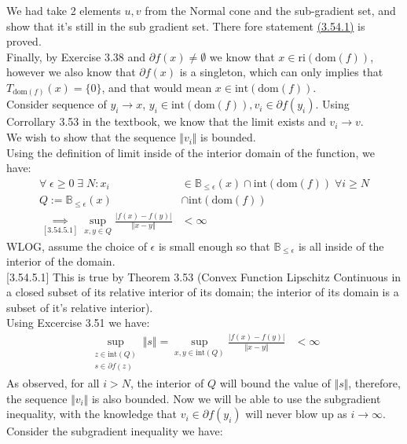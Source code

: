 \documentclass[]{article}
\begin{document}
    We had take 2 elements $u, v$ from the Normal cone and the sub-gradient set, and show that it's still in the sub gradient set. There fore statement \hyperref[eqn:3.54.1]{(3.54.1)} is proved. 
    \\[1.1em]
    Finally, by Exercise 3.38 and $\partial f(x)\neq \emptyset$ we know that $x\in \text{ri}(\text{dom}(f))$, however we also know that $\partial f(x)$ is a singleton, which can only implies that $T_{\text{dom}(f)}(x) = \{0\}$, and that would mean $x \in \text{int}(\text{dom}(f))$. 
    \\[1.1em]
    Consider sequence of $y_i \rightarrow x$, $y_i \in \text{int}(\text{dom}(f)),v_i \in \partial f(y_i)$. Using Corrollary 3.53 in the textbook, we know that the limit exists and $v_i \rightarrow v$. 
    \\[1.1em]
    We wish to show that the sequence $\Vert v_i\Vert$ is bounded. 
    \\
    Using the definition of limit inside of the interior domain of the function, we have: 
    \begin{align*}\tag{3.54.5}\label{eqn:3.54.5}
        \forall \;\epsilon \ge 0 \; \exists \;N: x_i &\in \mathbb{B}_{\le \epsilon}(x) \cap \text{int}(\text{dom}(f)) \;\forall i \ge N 
        \\
        Q := \mathbb{B}_{\le \epsilon}(x) &\cap \text{int}(\text{dom}(f)) 
        \\
        \underset{[3.54.5.1]}{\implies} \sup_{x,y\in Q} 
        \frac{|f(x) - f(y)|}{\Vert x - y\Vert} &< \infty 
    \end{align*}
    WLOG, assume the choice of $\epsilon$ is small enough so that $\mathbb{B}_{\le \epsilon}$ is all inside of the interior of the domain. 
    \\[0em]
    [3.54.5.1] This is true by Theorem 3.53 (Convex Function Lipschitz Continuous in a closed subset of its relative interior of its domain;  the interior of its domain is a subset of it's relative interior). 
    \\ [1.1em]
    Using Excercise 3.51 we have: 
    \begin{align*}\tag{3.54.6}\label{eqn:3.54.6}
        \sup_{\substack{z\in \text{int}(Q)\\ s \in \partial f(z)}} 
        \Vert s\Vert = \sup_{x,y\in \text{int}(Q)} 
        \frac{|f(x) - f(y)|}{\Vert x - y\Vert} &< \infty
    \end{align*}
    As observed, for all $i > N$, the interior of $Q$ will bound the value of $\Vert s\Vert$, therefore, the sequence $\Vert v_i\Vert$ is also bounded. Now we will be able to use the subgradient inequality, with the knowledge that $v_i\in \partial f(y_i)$  will never blow up as $i\rightarrow \infty$. Consider the subgradient inequality we have: 
\end{document}
